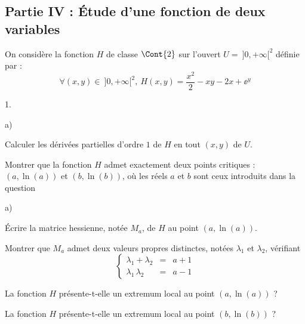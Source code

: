 \documentclass[11pt]{article}%
\begin{document}


\subsection*{Partie IV : Étude d'une fonction de deux variables}

\noindent
On considère la fonction $H$ de classe $\Cont{2}$ sur l'ouvert $U = \
]0,+\infty[^2$ définie par :
\[
  \forall (x,y) \in \ ]0,+\infty[^2, \ H(x,y) = \dfrac{x^2}{2} -xy-2x 
  + \ee^y
\]



\begin{noliste}{1.}
  \setlength{\itemsep}{4mm}
  \setcounter{enumi}{12}
  \item 
  \begin{noliste}{a)}
    \setlength{\itemsep}{2mm}
    \item Calculer les dérivées partielles d'ordre $1$ de $H$ en tout 
    $(x,y)$ de $U$.
    
    
    
    
    
    
    \item Montrer que la fonction $H$ admet exactement deux points 
    critiques : $(a, \ln(a))$ et $(b,\ln(b))$, où les réels $a$ et $b$
    sont ceux introduits dans la question \itbf{2.}
    
    
  \end{noliste}
  
  
  \item 
  \begin{noliste}{a)}
    \setlength{\itemsep}{2mm}
    \item Écrire la matrice hessienne, notée $M_a$, de $H$ au point
    $(a,\ln(a))$.
    
    

    
    \item Montrer que $M_a$ admet deux valeurs propres distinctes, 
    notées $\lambda_1$ et $\lambda_2$, vérifiant 
    \[
      \left\{
      \begin{array}{ccc}
        \lambda_1 + \lambda_2 & = & a+1\\
        \lambda_1 \, \lambda_2 & = & a-1
      \end{array}
      \right.
    \]
    
    
    
    
    \item La fonction $H$ présente-t-elle un extremum local au point
    $(a,\ln(a))$ ?
    
    
  \end{noliste}
  
  
  \item La fonction $H$ présente-t-elle un extremum local au point 
  $(b,\ln(b))$ ?
  
  
\end{noliste}
\end{document}
